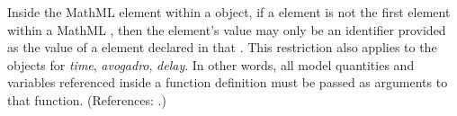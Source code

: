 Inside the  MathML element within a \FunctionDefinition
object, if a  element is not the first element within a MathML
, then the  element's value may only be an
identifier provided as the value of a  element declared in that
.  This restriction also applies to the 
objects for \emph{time}, \emph{avogadro}, \emph{delay}.  In other words, all model
quantities and variables referenced inside a function definition must be
passed as arguments to that function.  (References: .)
